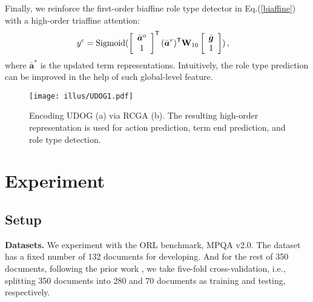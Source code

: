 \documentclass[letterpaper]{article} \usepackage{aaai22}  \usepackage{times}  \usepackage{helvet}  \usepackage{courier}  \usepackage[hyphens]{url}  \usepackage{graphicx} \urlstyle{rm} \def\UrlFont{\rm}  \usepackage{natbib}  \usepackage{caption} \DeclareCaptionStyle{ruled}{labelfont=normalfont,labelsep=colon,strut=off} \frenchspacing  \setlength{\pdfpagewidth}{8.5in}  \setlength{\pdfpageheight}{11in}  \usepackage{algorithm}
\begin{document}
Finally, we reinforce the first-order biaffine role type detector in Eq.(\ref{biaffine}) with a high-order triaffine attention:
\begin{equation}
\begin{aligned}
\setlength\abovedisplayskip{2pt}
\setlength\belowdisplayskip{2pt}
y^c &=
\text{Sigmoid} ( \left[
\begin{array}{c}
  \bar{\bm{a}}^{o}    \\
    1
\end{array}
\right]^\mathsf{T}
(\bar{\bm{a}}^{r})^\mathsf{T}
\mathbf{W}_{10} \left[
\begin{array}{c}
  \bar{\bm{g}}    \\
    1
\end{array}
\right]  )  \,,
\end{aligned}
\end{equation}
where $\bar{\bm{a}}^{*}$ is the updated term representations.
Intuitively, the role type prediction can be improved in the help of such global-level feature.





\begin{figure}[!t]
\centering
\texttt{[image: illus/UDOG1.pdf]}
\caption{
Encoding UDOG (a) via RCGA (b).
The resulting high-order representation is used for action prediction, term end prediction, and role type detection.
}
\label{UDOS1}
\end{figure} 

















\section{Experiment}








\subsection{Setup}




\noindent\textbf{Datasets.}
We experiment with the ORL benchmark, MPQA v2.0.
The dataset has a fixed number of 132 documents for developing.
And for the rest of 350 documents, following the prior work \cite{zhang-etal-2020-syntax,xia-etal-2021-unified}, we take five-fold cross-validation, i.e., splitting 350 documents into 280 and 70 documents as training and testing, respectively. 
\end{document}
